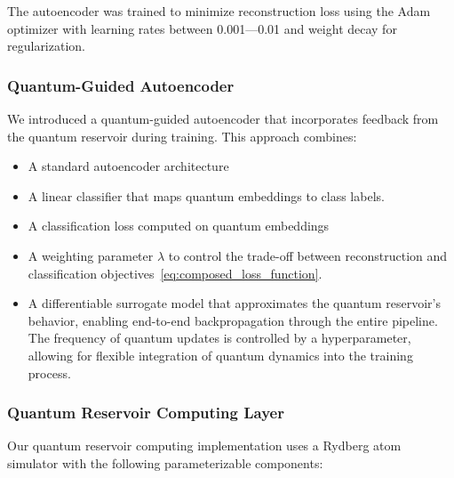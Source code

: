 \documentclass[conference]{IEEEtran}
\begin{document}
The autoencoder was trained to minimize reconstruction 
loss using the Adam optimizer with learning rates 
between 0.001—0.01 and weight decay for regularization.

\subsubsection{Quantum-Guided Autoencoder}
We introduced a quantum-guided autoencoder 
that incorporates feedback from the quantum 
reservoir during training. This approach combines:

\begin{itemize}
    \item A standard autoencoder architecture
    \item A linear classifier that maps quantum embeddings to class labels.
    \item A classification loss computed on quantum embeddings
    \item A weighting parameter $\lambda$ to control the trade-off between 
    reconstruction and classification objectives~\ref{eq:composed_loss_function}.
    \item A differentiable surrogate model that approximates the quantum reservoir's behavior,
    enabling end-to-end backpropagation through the entire pipeline. The frequency 
    of quantum updates is controlled by a hyperparameter, allowing for
    flexible integration of quantum dynamics into the training process.
\end{itemize}


\subsubsection{Quantum Reservoir Computing Layer}
Our quantum reservoir computing implementation uses 
a Rydberg atom simulator with the following parameterizable
components:
\end{document}

